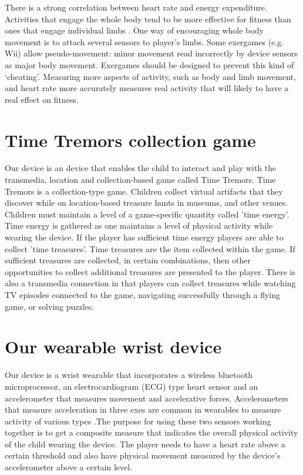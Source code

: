\documentclass{SIGCHI2015LaTex/sigchi}
\begin{document}
There is a strong correlation between heart rate and energy expenditure\cite{whitehead2010exergame}. Activities that engage the whole body tend to be more effective for fitness than ones that engage individual limbs \cite{mortazavi2014near}. One way of encouraging whole body movement is to attach several sensors to player's limbs. Some exergames (e.g. Wii) allow pseudo-movement: minor movement read incorrectly by device sensors as major body movement. Exergames should be designed to prevent this kind of `cheating'. Measuring more aspects of activity, such as body and limb movement, and heart rate more accurately measures real activity that will likely to have a real effect on fitness.  

\section{Time Tremors collection game}
Our device is an device that enables the child to interact and play with the transmedia, location and collection-based game called Time Tremors. Time Tremors is a collection-type game. Children collect virtual artifacts that they discover while on location-based treasure hunts in museums, and other venues. Children must maintain a level of a game-specific quantity called 'time energy'. Time energy is gathered as one maintains a level of physical activity while wearing the device. If the player has sufficient time energy players are able to collect 'time treasures'. Time treasures are the item collected within the game. If sufficient treasures are collected, in certain combinations, then other opportunities to collect additional treasures are presented to the player. There is also a transmedia connection in that players can collect treasures while watching TV episodes connected to the game, navigating successfully through a flying game, or solving puzzles.

\section{Our wearable wrist device}
Our device is a wrist wearable that incorporates a wireless bluetooth microprocessor, an electrocardiogram (ECG) type heart sensor and an accelerometer that measures movement and accelerative forces. Accelerometers that measure acceleration in three exes are common in wearables to measure activity of various types \cite{alshurafa2014designing}.The purpose for using these two sensors working together is to get a composite measure that indicates the overall physical activity of the child wearing the device. The player needs to have a heart rate above a certain threshold and also have physical movement measured by the device's accelerometer above a certain level. 
\end{document}
